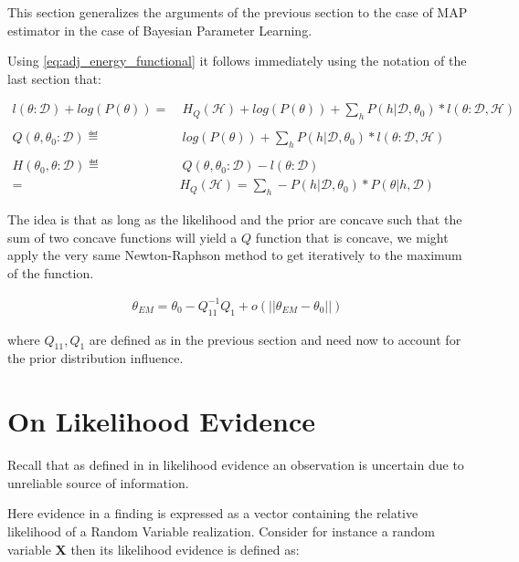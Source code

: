 \documentclass[11pt]{article}
\begin{document}
\begin{article}
This section generalizes the arguments of the previous section to
the case of MAP estimator in the case of Bayesian Parameter
Learning.

Using \ref{eq:adj_energy_functional} it follows immediately using the
notation of the last section that:

\begin{align} \label{eq:likelihood_energy_map_iterative}
l (\theta: \mathscr{D}) + log(P(\theta)) =& \ H_Q (\mathscr {H}) + log(P(\theta)) + \sum_h P(h | \mathscr{D}, \theta_0) * l (\theta: \mathscr{D}, \mathscr{H})\\
\nonumber\\
Q(\theta, \theta_0 : \mathscr{D}) \eqdef& \ log(P(\theta)) + \sum_h P(h | \mathscr{D}, \theta_0) * l (\theta: \mathscr{D}, \mathscr{H})\\
\nonumber\\  
H(\theta_0, \theta: \mathscr{D}) \eqdef& \ Q(\theta, \theta_0 : \mathscr{D}) - l (\theta: \mathscr{D}) \\
                                 =& H_Q (\mathscr {H}) = \sum_h - P(h | \mathscr{D}, \theta_0) * P(\theta | h, \mathscr{D}) \nonumber
\end{align}

The idea is that as long as the likelihood and the prior are
concave such that the sum of two concave functions will yield a \(Q\)
function that is concave, we might apply the very same
Newton-Raphson method to get iteratively to the maximum of the
function.

\begin{align} 
 \theta_{EM}  = \theta_{0} - Q_{11}^{-1} Q_1 + o(||\theta_{EM} - \theta_{0}||) \label{eq:em-iterative}
\end{align}

where \(Q_{11}, Q_1\) are defined as in the previous section and
need now to account for the prior distribution influence.


\section{On Likelihood Evidence}
\label{sec:orga9640bb}

Recall that as defined in \cite{Mrad_2015} in likelihood evidence an
observation is uncertain due to unreliable source of information.

Here evidence in a finding is expressed as a vector containing the
relative likelihood of a Random Variable realization. Consider for
instance a random variable \textbf{X} then its likelihood evidence is
defined as:


\end{article}
\end{document}
